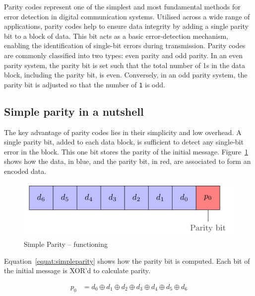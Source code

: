 Parity codes represent one of the simplest and most fundamental methods for error detection in digital communication systems. Utilised across a wide range of applications, parity codes help to ensure data integrity by adding a single parity bit to a block of data. This bit acts as a basic error-detection mechanism, enabling the identification of single-bit errors during transmission. Parity codes are commonly classified into two types: even parity and odd parity. In an even parity system, the parity bit is set such that the total number of 1s in the data block, including the parity bit, is even. Conversely, in an odd parity system, the parity bit is adjusted so that the number of \texttt{1} is odd.

\subsection{Simple parity in a nutshell}
The key advantage of parity codes lies in their simplicity and low overhead. A single parity bit, added to each data block, is sufficient to detect any single-bit error in the block. This one bit stores the parity of the initial message. Figure~\ref{fig:simpleparity_functionning} shows how the data, in blue, and the parity bit, in red, are associated to form an encoded data.

\begin{figure}[ht]
    \centering
    \includegraphics[page=1]{c5_countermeasures_dift/img/simple_parity.pdf}
    \caption{Simple Parity -- functioning}
    \label{fig:simpleparity_functionning}
\end{figure}

Equation~\ref{equat:simpleparity} shows how the parity bit is computed. Each bit of the initial message is XOR'd to calculate parity.

\begin{equation} \label{equat:simpleparity}
    \begin{split}
        p_{0} &= d_{0} \oplus d_{1} \oplus d_{2} \oplus d_{3} \oplus d_{4} \oplus d_{5} \oplus d_{6}
    \end{split}
\end{equation}

